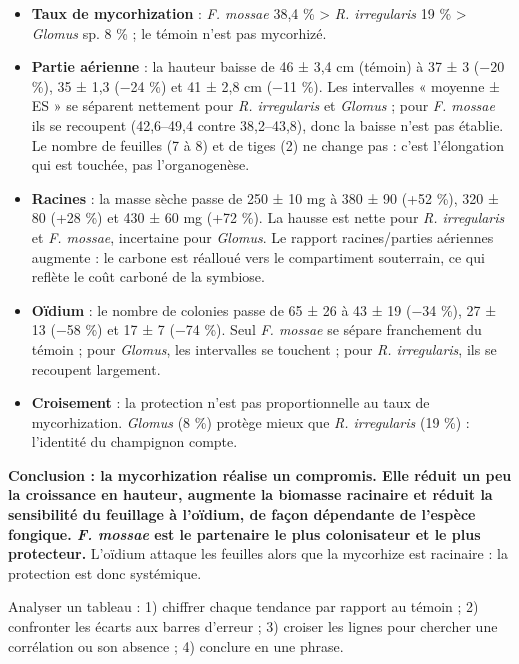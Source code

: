 \documentclass[11pt,a4paper]{article}
\providecommand{\tightlist}{\setlength{\itemsep}{0pt}\setlength{\parskip}{0pt}}
\begin{document}
\begin{itemize}
\tightlist
\item
  \textbf{Taux de mycorhization} : \emph{F. mossae} 38,4 \% \textgreater{} \emph{R. irregularis} 19 \% \textgreater{} \emph{Glomus} sp. 8 \% ; le témoin n'est pas mycorhizé.
\item
  \textbf{Partie aérienne} : la hauteur baisse de 46 ± 3,4 cm (témoin) à 37 ± 3 (−20 \%), 35 ± 1,3 (−24 \%) et 41 ± 2,8 cm (−11 \%). Les intervalles « moyenne ± ES » se séparent nettement pour \emph{R. irregularis} et \emph{Glomus} ; pour \emph{F. mossae} ils se recoupent (42,6--49,4 contre 38,2--43,8), donc la baisse n'est pas établie. Le nombre de feuilles (7 à 8) et de tiges (2) ne change pas : c'est l'élongation qui est touchée, pas l'organogenèse.
\item
  \textbf{Racines} : la masse sèche passe de 250 ± 10 mg à 380 ± 90 (+52 \%), 320 ± 80 (+28 \%) et 430 ± 60 mg (+72 \%). La hausse est nette pour \emph{R. irregularis} et \emph{F. mossae}, incertaine pour \emph{Glomus}. Le rapport racines/parties aériennes augmente : le carbone est réalloué vers le compartiment souterrain, ce qui reflète le coût carboné de la symbiose.
\item
  \textbf{Oïdium} : le nombre de colonies passe de 65 ± 26 à 43 ± 19 (−34 \%), 27 ± 13 (−58 \%) et 17 ± 7 (−74 \%). Seul \emph{F. mossae} se sépare franchement du témoin ; pour \emph{Glomus}, les intervalles se touchent ; pour \emph{R. irregularis}, ils se recoupent largement.
\item
  \textbf{Croisement} : la protection n'est pas proportionnelle au taux de mycorhization. \emph{Glomus} (8 \%) protège mieux que \emph{R. irregularis} (19 \%) : l'identité du champignon compte.
\end{itemize}

\textbf{Conclusion : la mycorhization réalise un compromis. Elle réduit un peu la croissance en hauteur, augmente la biomasse racinaire et réduit la sensibilité du feuillage à l'oïdium, de façon dépendante de l'espèce fongique. \emph{F. mossae} est le partenaire le plus colonisateur et le plus protecteur.} L'oïdium attaque les feuilles alors que la mycorhize est racinaire : la protection est donc systémique.

\begin{methode}

Analyser un tableau : 1) chiffrer chaque tendance par rapport au témoin ; 2) confronter les écarts aux barres d'erreur ; 3) croiser les lignes pour chercher une corrélation ou son absence ; 4) conclure en une phrase.

\end{methode}
\end{document}
